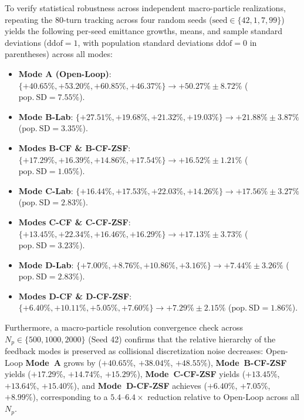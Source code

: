\documentclass[11pt,a4paper]{article}
\begin{document}
To verify statistical robustness across independent macro-particle realizations, repeating the 80-turn tracking across four random seeds ($\mathrm{seed} \in \{42, 1, 7, 99\}$) yields the following per-seed emittance growths, means, and sample standard deviations ($\mathrm{ddof}=1$, with population standard deviations $\mathrm{ddof}=0$ in parentheses) across all modes:
{\sloppy
\begin{itemize}
    \item \textbf{Mode A (Open-Loop)}: $\{+40.65\%, +53.20\%, +60.85\%, +46.37\%\} \to +50.27\% \pm 8.72\%$ ($\mathrm{pop.\ SD} = 7.55\%$).
    \item \textbf{Mode B-Lab}: $\{+27.51\%, +19.68\%, +21.32\%, +19.03\%\} \to +21.88\% \pm 3.87\%$ ($\mathrm{pop.\ SD} = 3.35\%$).
    \item \textbf{Modes B-CF \& B-CF-ZSF}: $\{+17.29\%, +16.39\%, +14.86\%, +17.54\%\} \to +16.52\% \pm 1.21\%$ ($\mathrm{pop.\ SD} = 1.05\%$).
    \item \textbf{Mode C-Lab}: $\{+16.44\%, +17.53\%, +22.03\%, +14.26\%\} \to +17.56\% \pm 3.27\%$ ($\mathrm{pop.\ SD} = 2.83\%$).
    \item \textbf{Modes C-CF \& C-CF-ZSF}: $\{+13.45\%, +22.34\%, +16.46\%, +16.29\%\} \to +17.13\% \pm 3.73\%$ ($\mathrm{pop.\ SD} = 3.23\%$).
    \item \textbf{Mode D-Lab}: $\{+7.00\%, +8.76\%, +10.86\%, +3.16\%\} \to +7.44\% \pm 3.26\%$ ($\mathrm{pop.\ SD} = 2.83\%$).
    \item \textbf{Modes D-CF \& D-CF-ZSF}: $\{+6.40\%, +10.11\%, +5.05\%, +7.60\%\} \to +7.29\% \pm 2.15\%$ ($\mathrm{pop.\ SD} = 1.86\%$).
\end{itemize}
}
Furthermore, a macro-particle resolution convergence check across $N_p \in \{500, 1000, 2000\}$ (Seed 42) confirms that the relative hierarchy of the feedback modes is preserved as collisional discretization noise decreases: Open-Loop \textbf{Mode~A} grows by ($+40.65\%$, $+38.04\%$, $+48.55\%$), \textbf{Mode~B-CF-ZSF} yields ($+17.29\%$, $+14.74\%$, $+15.29\%$), \textbf{Mode~C-CF-ZSF} yields ($+13.45\%$, $+13.64\%$, $+15.40\%$), and \textbf{Mode~D-CF-ZSF} achieves ($+6.40\%$, $+7.05\%$, $+8.99\%$), corresponding to a $5.4\text{--}6.4\times$ reduction relative to Open-Loop across all $N_p$.
\end{document}
